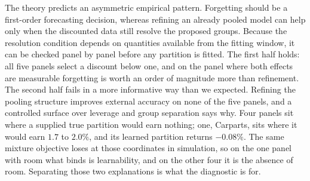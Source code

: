 \documentclass[twoside]{article}
\theoremstyle{definition}
\begin{document}
The theory predicts an asymmetric empirical pattern. Forgetting should be
a first-order forecasting decision, whereas refining an already pooled
model can help only when the discounted data still resolve the proposed
groups. Because the resolution condition depends on quantities available
from the fitting window, it can be checked panel by panel before any
partition is fitted. The first half holds: all five panels select a
discount below one, and on the panel where both effects are measurable
forgetting is worth an order of magnitude more than refinement. The second
half fails in a more informative way than we expected. Refining the
pooling structure improves external accuracy on none of the five panels,
and a controlled surface over leverage and group separation says why.
Four panels sit where a supplied true partition would earn nothing; one,
Carparts, sits where it would earn $1.7$ to $2.0\%$, and its learned
partition returns $-0.08\%$. The same mixture objective loses at those
coordinates in simulation, so on the one panel with room what binds is
learnability, and on the other four it is the absence of room. Separating
those two explanations is what the diagnostic is for.
\end{document}
